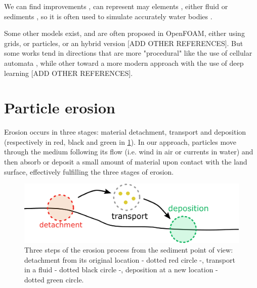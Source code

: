 We can find improvements \cite{Roose2011}, can represent may elements \cite{Iwasaki2010}, either fluid or sediments \cite{Lenaerts2009}, so it is often used to simulate accurately water bodies \cite{Nikeghabali2018}.

Some other models exist, and are often proposed in OpenFOAM, either using grids, or particles, or an hybrid version \cite{Caretto1973} [ADD OTHER REFERENCES]. But some works tend in directions that are more "procedural" like the use of cellular automata \cite{Boldea2009,Cattaneo2005}, while other toward a more modern approach with the use of deep learning \cite{Tompson2017} [ADD OTHER REFERENCES].





\section{Particle erosion}%
\label{sec:erosion_method}
Erosion occurs in three stages: material detachment, transport and deposition (respectively in red, black and green in \cref{fig:erosion_ablation_erosion}). In our approach, particles move through the medium following its flow (i.e. wind in air or currents in water) and then absorb or deposit a small amount of material upon contact with the land surface, effectively fulfilling the three stages of erosion.
\begin{figure}[ht]
\centering
\includegraphics[width=0.95\linewidth]{figures/ablation_erosion.pdf}
\caption{Three steps of the erosion process from the sediment point of view: detachment from its original location - dotted red circle -, transport in a fluid - dotted black circle -, deposition at a new location - dotted green circle.}
\label{fig:erosion_ablation_erosion}

\end{figure}
